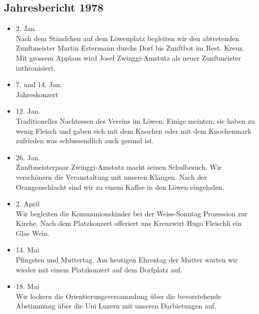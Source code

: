 \subsection{Jahresbericht 1978}

\begin{history}


    \begin{itemize}

        \item[]2. Jan.\\
        Nach dem Ständchen auf dem Löwenplatz begleiten wir den abtretenden
        Zunftmeister Martin Estermann durchs Dorf bis Zunftbot im Rest. Kreuz.
        Mit grossem Applaus wird Josef Zwinggi-Amstutz als neuer Zunftmeister
        inthronisiert.

        \item[]7. und 14. Jan.\\
        Jahreskonzert

        \item[]12. Jan.\\
        Traditionelles Nachtessen des Vereins im Löwen. Einige meinten, sie
        haben zu wenig Fleisch und gaben sich mit dem Knochen oder mit dem
        Knochenmark zufrieden was schlussendlich auch gesund ist.

        \item[]26. Jan.\\
        Zunftmeisterpaar Zwinggi-Amstutz macht seinen Schulbesuch. Wir
        verschönern die Veranstaltung mit unseren Klängen. Nach der
        Orangenschlacht sind wir zu einem Kaffee in den Löwen eingeladen.

        \item[]2. April\\
        Wir begleiten die Kommunionskinder bei der Weiss-Sonntag Prozession zur
        Kirche. Nach dem Platzkonzert offeriert uns Kreuzwirt Hugo Fleischli ein
        Glas Wein.

        \item[]14. Mai\\
        Pfingsten und Muttertag. Am heutigen Ehrentag der Mutter warten wir
        wieder mit einem Platzkonzert auf dem Dorfplatz auf.

        \item[]18. Mai\\
        Wir lockern die Orientierungsversammlung über die bevorstehende
        Abstimmung über die Uni Luzern mit unseren Darbietungen auf.


\end{itemize}
\end{history}
